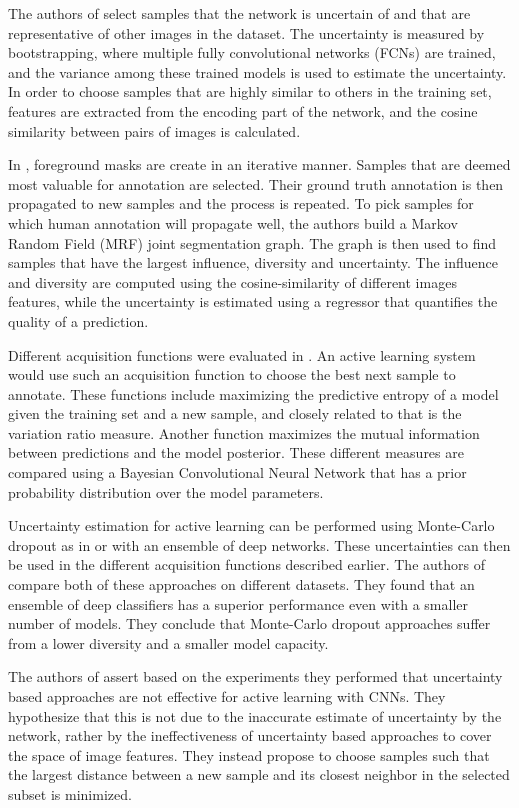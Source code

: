 \documentclass[letterpaper, 10 pt, conference]{ieeeconf}  %
\begin{document}
The authors of \cite{yang2017suggestive} select samples that the network is uncertain of and that are representative of other images in the dataset. The uncertainty is measured by bootstrapping, where multiple fully convolutional networks (FCNs) are trained, and the variance among  these trained models is used to estimate the uncertainty. In order to choose samples that are highly similar to others in the training set, features are extracted from the encoding part of the network, and the cosine similarity between pairs of images is calculated. 

In \cite{dutt2016active}, foreground masks are create in an iterative manner. Samples that are deemed most valuable for annotation are selected. Their ground truth annotation is then propagated to new samples and the process is repeated. To pick samples for which human annotation will propagate well, the authors build a Markov Random Field (MRF) joint segmentation graph. The graph is then used to find samples that have the largest influence, diversity and uncertainty. The influence and diversity are computed using the cosine-similarity of different images features, while the uncertainty is estimated using a regressor that quantifies the quality of a prediction. 

Different acquisition functions were evaluated in \cite{gal2017deep}. An active learning system would use such an acquisition function to choose the best next sample to annotate. These functions include maximizing the predictive entropy of a model given the training set and a new sample, and closely related to that is the variation ratio measure. Another function maximizes the mutual information between predictions and the model posterior. These different measures are compared using a Bayesian Convolutional Neural Network that has a prior probability distribution over the model parameters.  

Uncertainty estimation for active learning can be performed using Monte-Carlo dropout as in \cite{gal2017deep} or with an ensemble of deep networks. These uncertainties can then be used in the different acquisition functions described earlier. The authors of \cite{beluch2018power} compare both of these approaches on different datasets. They found that an ensemble of deep classifiers has a superior performance even with a smaller number of models. They conclude that Monte-Carlo dropout approaches suffer from a lower diversity and a smaller model capacity.

The authors of \cite{sener2017geometric} assert based on the experiments they performed that uncertainty based approaches are not effective for active learning with CNNs. They hypothesize that this is not due to the inaccurate estimate of uncertainty by the network, rather by the ineffectiveness of uncertainty based approaches to cover the space of image features. They instead propose to choose samples such that the largest distance between a new sample and its closest neighbor in the selected subset is minimized.
\end{document}
